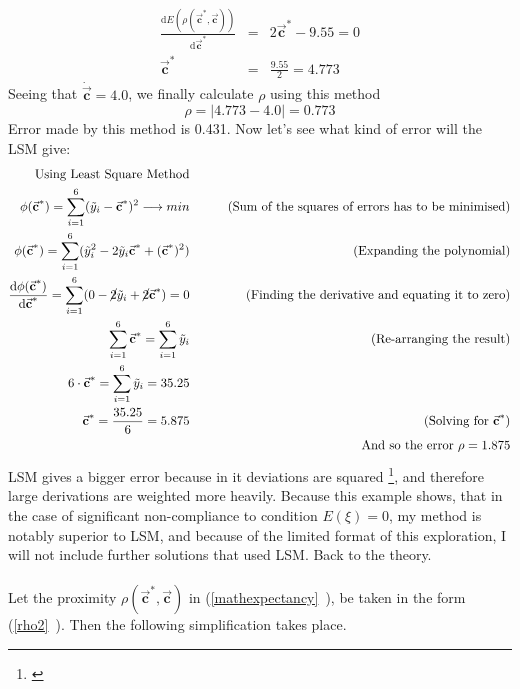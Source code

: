 \documentclass[11pt,a4paper]{article}
\numberwithin{equation}{subsection}
\newcommand{\vecc}{\vec{\textbf{c}}}
\begin{document}
\begin{eqnarray*}
\frac{\mathrm{d}E(\rho(\vecc^{*},\vecc))}{\mathrm{d}\vecc^{*}} &=& 2\vecc^{*}-9.55 = 0 \\
\vecc^{*} &=& \frac{9.55}{2} = 4.773
\end{eqnarray*}
Seeing that $\dot{\vecc} = 4.0$, we finally calculate $\rho$ using this method
\begin{equation*}
\rho = |4.773-4.0| = 0.773
\end{equation*}
Error made by this method is 0.431. Now let's see what kind of error will the LSM give:
\begin{eqnarray*}
\text{Using Least Square Method} \\
\phi(\vecc^{*})= \sum\limits_{i=1}^{6}(\tilde{y}_{i}-\vecc^{*})^{2} \longrightarrow min &\qquad & \text{(Sum of the squares of errors has to be minimised)}\\
\phi(\vecc^{*})= \sum\limits_{i=1}^{6}(\tilde{y}_{i}^{2}-2 \tilde{y}_{i}\vecc^{*} + (\vecc^{*})^{2}) &\qquad & \text{(Expanding the polynomial)}\\
\frac{\mathrm{d}\phi(\vecc^{*})}{\mathrm{d}\vecc^{*}} =  \sum\limits_{i=1}^{6}(0 -\cancel{2} \tilde{y}_{i} +\cancel{2} \vecc^{*}) = 0  &\qquad & \text{(Finding the derivative and equating it to zero)}\\
 \sum\limits_{i=1}^{6}\vecc^{*} = \sum\limits_{i=1}^{6} \tilde{y}_{i} &\qquad & \text{(Re-arranging the result)}\\
 6 \cdot \vecc^{*} = \sum\limits_{i=1}^{6} \tilde{y}_{i} = 35.25 &\qquad & \\
 \vecc^{*} = \frac{35.25}{6} = 5.875 &\qquad & \text{(Solving for $\vecc^{*}$)}\\
& \qquad & \text{And so the error } \rho = 1.875
\end{eqnarray*}
LSM gives a bigger error because in it deviations are squared \footnote{\cite{Plackett_1950}}, and therefore large derivations are weighted more heavily. Because this example shows, that in the case of significant non-compliance to condition $E(\xi)=0$, my method is notably superior to LSM, and because of the limited format of this exploration, I will not include further solutions that used LSM. %
 Back to the theory.\\
\\
Let the proximity $\rho(\vecc^{*},\vecc)$ in (\vref{mathexpectancy}~), be taken in the form (\vref{rho2}~). Then the following simplification takes place.
\end{document}
